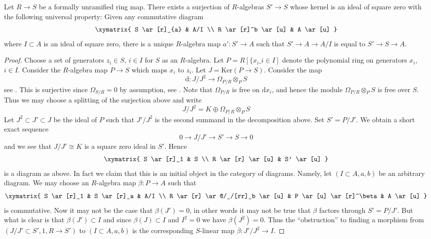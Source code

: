 \begin{lemma}
\label{lemma-universal-thickening}
Let $R \to S$ be a formally unramified ring map. There exists a surjection of
$R$-algebras $S' \to S$ whose kernel is an ideal of square zero with the
following universal property: Given any commutative diagram
$$
\xymatrix{
S \ar[r]_{a} & A/I \\
R \ar[r]^b \ar[u] & A \ar[u]
}
$$
where $I \subset A$ is an ideal of square zero, there is a unique $R$-algebra
map $a' : S' \to A$ such that $S' \to A \to A/I$ is equal to $S' \to S \to A$.
\end{lemma}

\begin{proof}
Choose a set of generators $z_i \in S$, $i \in I$ for $S$ as an $R$-algebra.
Let $P = R[\{x_i\_{i \in I}]$ denote the polynomial ring on generators
$x_i$, $i \in I$. Consider the $R$-algebra map $P \to S$ which maps
$x_i$ to $z_i$. Let $J = \text{Ker}(P \to S)$. Consider the map
$$
\text{d} : J/J^2 \longrightarrow \Omega_{P/R} \otimes_P S
$$
see
.
This is surjective since $\Omega_{S/R} = 0$ by assumption, see
.
Note that $\Omega_{P/R}$ is free on $\text{d}x_i$, and hence the module
$\Omega_{P/R} \otimes_P S$ is free over $S$. Thus we may choose a splitting
of the surjection above and write
$$
J/J^2 = K \oplus \Omega_{P/R} \otimes_P S
$$
Let $J^2 \subset J' \subset J$ be the ideal of $P$ such that
$J'/J^2$ is the second summand in the decomposition above.
Set $S' = P/J'$. We obtain a short exact sequence
$$
0 \to J/J' \to S' \to S \to 0
$$
and we see that $J/J' \cong K$ is a square zero ideal in $S'$. Hence
$$
\xymatrix{
S \ar[r]_1 & S \\
R \ar[r] \ar[u] & S' \ar[u]
}
$$
is a diagram as above. In fact we claim that this is an initial object in
the category of diagrams. Namely, let $(I \subset A, a, b)$ be an arbitrary
diagram. We may choose an $R$-algebra map $\beta : P \to A$ such that
$$
\xymatrix{
S \ar[r]_1 & S \ar[r]_a & A/I \\
R \ar[r] \ar@/_/[rr]_b \ar[u] & P \ar[u] \ar[r]^\beta & A \ar[u]
}
$$
is commutative. Now it may not be the case that $\beta(J') = 0$, in other
words it may not be true that $\beta$ factors through $S' = P/J'$.
But what is clear is that $\beta(J') \subset I$ and
since $\beta(J) \subset I$ and $I^2 = 0$ we have $\beta(J^2) = 0$.
Thus the ``obstruction'' to finding a morphism from
$(J/J' \subset S', 1, R \to S')$ to $(I \subset A, a, b)$ is
the corresponding $S$-linear map $\overline{\beta} : J'/J^2 \to I$.

\end{proof}
